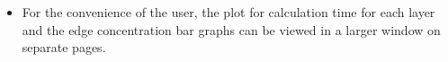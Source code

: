 \begin{itemize}
    
    
    \item For the convenience of the user, the plot for calculation time for each layer and the edge concentration bar graphs can be viewed in a larger window on separate pages.
    
\end{itemize}

